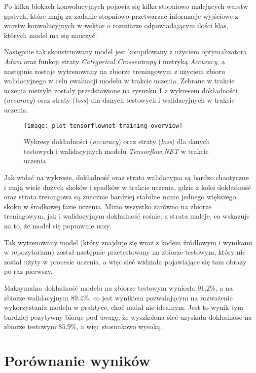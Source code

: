 Po kilku blokach konwolucyjnych pojawia się kilka stopniowo malejących warstw gęstych, które mają za zadanie stopniowo przetwarzać informacje wyjściowe z warstw konwolucyjnych w wektor o rozmiarze odpowiadającym ilości klas, których model ma się nauczyć.

Następnie tak skonstruowany model jest kompilowany z użyciem optymalizatora \emph{Adam} oraz funkcji straty \emph{Categorical Crossentropy} i metryką \emph{Accuracy}, a następnie zostaje wytrenowany na zbiorze treningowym z użyciem zbioru walidacyjnego w celu ewaluacji modelu w trakcie uczenia.
Zebrane w trakcie uczenia metryki zostały przedstawione na \hyperref[fig:plot-tensorflownet-training-overview]{rysunku \ref*{fig:plot-tensorflownet-training-overview}} z wykresem dokładności (\emph{accuracy}) oraz straty (\emph{loss}) dla danych testowych i walidacyjnych w trakcie uczenia.

\begin{figure}[ht]
  \texttt{[image: plot-tensorflownet-training-overview]}
  \caption[Wykresy statystyk modelu Tensorflow.NET w trakcie uczenia]{Wykresy dokładności (\emph{accuracy}) oraz straty (\emph{loss}) dla danych testowych i walidacyjnych modelu \emph{Tensorflow.NET} w trakcie uczenia}
  \label{fig:plot-tensorflownet-training-overview}
\end{figure}

Jak widać na wykresie, dokładność oraz strata walidacyjna są bardzo chaotyczne i mają wiele dużych skoków i spadków w trakcie uczenia, gdzie z kolei dokładność oraz strata treningowa są znacznie bardziej stabilne mimo jednego większego skoku w środkowej fazie uczenia.
Mimo wszystko zarówno na zbiorze treningowym, jak i walidacyjnym dokładność rośnie, a strata maleje, co wskazuje na to, że model się poprawnie uczy.

Tak wytrenowany model (który znajduje się wraz z kodem źródłowym i wynikami w repozytorium) został następnie przetestowany na zbiorze testowym, który nie został użyty w procesie uczenia, a więc sieć widziała pojawiające się tam obrazy po raz pierwszy.

Maksymalna dokładność modelu na zbiorze testowym wyniosła $91.2\%$, a na zbiorze walidacyjnym $89.4\%$, co jest wynikiem pozwalającym na rozważenie wykorzystania modelu w praktyce, choć nadal nie idealnym.
Jest to wynik tym bardziej pozytywny biorąc pod uwagę, że wyszkolona sieć uzyskała dokładność na zbiorze testowym $85.9\%$, a więc stosunkowo wysoką.

\section{Porównanie wyników}

